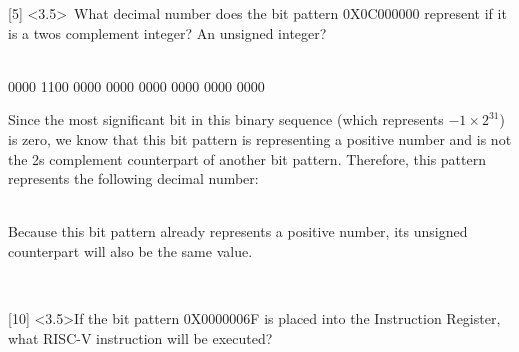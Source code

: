 \documentclass[12pt]{article}
\begin{document}
	
	
	
	
	\newpage
	
	
	
	
	
	\noindent {} 
	[5] \textless3.5\textgreater \ What decimal number does the bit pattern 0X0C000000 represent if it is a twos complement integer? An unsigned integer?\\
	\begin{center}

		 \vspace{0.3cm} \\
		
		0000 1100 0000 0000 0000 0000 0000 0000 \\
		\vspace{0.3cm}
		
		Since the most significant bit in this binary sequence (which represents $-1 \times 2^{31}$) is zero, we know that this bit pattern is representing a positive number and is not the 2s complement counterpart of another bit pattern. Therefore, this pattern represents the following decimal number: \\ 
		
		\vspace{0.3cm}
		 \\
		
		\vspace{0.9cm}
		
		Because this bit pattern already represents a positive number, its unsigned counterpart will also be the same value.
		
		\vspace{0.3cm}
		 \\
	\end{center}
	
	
	
	
	
	
	\newpage
	
	
	
	
	
	
	\noindent {} 
	[10] \textless3.5\textgreater If the bit pattern 0X0000006F is placed into the Instruction Register, what RISC-V instruction will be executed? \vspace{0.15cm} \\
	
\end{document}
